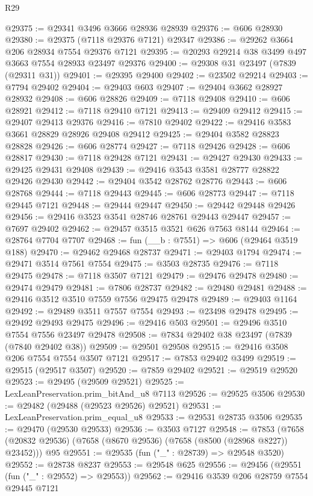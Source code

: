 \begin{lexlean}{R29}
\begin{coremodule}
@29375 := @29341 @3496 @3666 @28936 @28939
@29376 := @606 @28930
@29380 := @29375 (@7118 @29376 @7121) @29347
@29386 := @29262 @3664 @206 @28934 @7554 @29376 @7121
@29395 := @20293 @29214 @38 @3499 @497 @3663 @7554 @28933 @23497 @29376
@29400 := @29308 @31 @23497 (@7839 (@29311 @31))
@29401 := @29395 @29400
@29402 := @23502 @29214
@29403 := @7794 @29402
@29404 := @29403 @603
@29407 := @29404 @3662 @28927 @28932
@29408 := @606 @28826
@29409 := @7118 @29408
@29410 := @606 @28921
@29412 := @7118 @29410 @7121
@29413 := @29409 @29412
@29415 := @29407 @29413 @29376
@29416 := @7810 @29402
@29422 := @29416 @3583 @3661 @28829 @28926 @29408 @29412
@29425 := @29404 @3582 @28823 @28828
@29426 := @606 @28774
@29427 := @7118 @29426
@29428 := @606 @28817
@29430 := @7118 @29428 @7121
@29431 := @29427 @29430
@29433 := @29425 @29431 @29408
@29439 := @29416 @3543 @3581 @28777 @28822 @29426 @29430
@29442 := @29404 @3542 @28762 @28776
@29443 := @606 @28768
@29444 := @7118 @29443
@29445 := @606 @28773
@29447 := @7118 @29445 @7121
@29448 := @29444 @29447
@29450 := @29442 @29448 @29426
@29456 := @29416 @3523 @3541 @28746 @28761 @29443 @29447
@29457 := @7697 @29402
@29462 := @29457 @3515 @3521 @626 @7563 @8144
@29464 := @28764 @7704 @7707
@29468 := fun (__b : @7551) => @606 (@29464 @3519 @188)
@29470 := @29462 @29468 @28737
@29471 := @29403 @1794
@29474 := @29471 @3514 @7561 @7554
@29475 := @3503 @28735
@29476 := @7118 @29475
@29478 := @7118 @3507 @7121
@29479 := @29476 @29478
@29480 := @29474 @29479
@29481 := @7806 @28737
@29482 := @29480 @29481
@29488 := @29416 @3512 @3510 @7559 @7556 @29475 @29478
@29489 := @29403 @1164
@29492 := @29489 @3511 @7557 @7554
@29493 := @23498 @29478
@29495 := @29492 @29493 @29475
@29496 := @29416 @503
@29501 := @29496 @3510 @7554 @7556 @23497 @29478
@29508 := @7834 @29402 @38 @23497 (@7839 (@7840 @29402 @38))
@29509 := @29501 @29508
@29515 := @29416 @3508 @206 @7554 @7554 @3507 @7121
@29517 := @7853 @29402 @3499
@29519 := @29515 (@29517 @3507)
@29520 := @7859 @29402
@29521 := @29519 @29520
@29523 := @29495 (@29509 @29521)
@29525 := LexLeanPreservation.prim_bitAnd_u8 @7113
@29526 := @29525 @3506
@29530 := @29482 (@29488 (@29523 @29526) @29521)
@29531 := LexLeanPreservation.prim_equal_u8
@29533 := @29531 @28735 @3506
@29535 := @29470 (@29530 @29533)
@29536 := @3503 @7127
@29548 := @7853
    (@7658 (@20832 @29536) (@7658 (@8670 @29536) (@7658 (@8500 (@28968 @8227)) @23452)))
    @95
@29551 := @29535 (fun ("_" : @28739) => @29548 @3520)
@29552 := @28738 @8237
@29553 := @29548 @625
@29556 := @29456 (@29551 (fun ("_" : @29552) => @29553))
@29562 := @29416 @3539 @206 @28759 @7554 @29445 @7121

\end{coremodule}
\end{lexlean}
